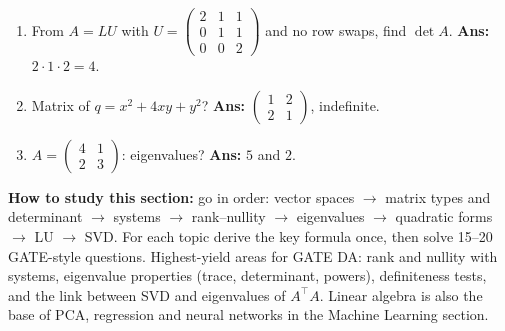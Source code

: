 \documentclass[11pt,a4paper]{article}
\newcommand{\T}{^{\top}}
\begin{document}
\begin{enumerate}[leftmargin=*,itemsep=4pt]
\item From $A=LU$ with $U=\begin{pmatrix}2&1&1\\0&1&1\\0&0&2\end{pmatrix}$ and no row swaps, find $\det A$. \hfill \textbf{Ans: } $2\cdot1\cdot2=4$.
\item Matrix of $q=x^2+4xy+y^2$? \hfill \textbf{Ans: } $\begin{pmatrix}1&2\\2&1\end{pmatrix}$, indefinite.
\item $A=\begin{pmatrix}4&1\\2&3\end{pmatrix}$: eigenvalues? \hfill \textbf{Ans: } $5$ and $2$.
\end{enumerate}

\vspace{1em}
\textbf{How to study this section:} go in order: vector spaces $\to$ matrix types and determinant $\to$ systems $\to$ rank--nullity $\to$ eigenvalues $\to$ quadratic forms $\to$ LU $\to$ SVD. For each topic derive the key formula once, then solve 15--20 GATE-style questions. Highest-yield areas for GATE DA: rank and nullity with systems, eigenvalue properties (trace, determinant, powers), definiteness tests, and the link between SVD and eigenvalues of $A\T A$. Linear algebra is also the base of PCA, regression and neural networks in the Machine Learning section.
\end{document}
